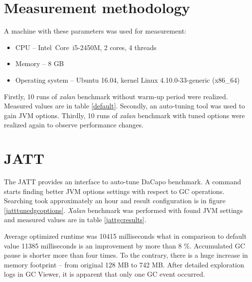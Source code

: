 \documentclass[
  digital, %
  oneside,
  notable, %
  nolof,     %
  nolot     %
]{fithesis3}
\begin{document}
\section{Measurement methodology}
A machine with these parameters was used for measurement:
\begin{itemize}
	\item CPU -- Intel\textregistered\ Core\texttrademark\ i5-2450M, 2 cores, 4 threads
	\item Memory -- 8 GB
	\item Operating system -- Ubuntu 16.04, kernel Linux 4.10.0-33-generic (x86\_64)
\end{itemize}

Firstly, 10 runs of \textit{xalan} benchmark without warm-up period were realized. Measured values are in table \ref{default}. Secondly, an auto-tuning tool was used to gain JVM options. Thirdly, 10 runs of \textit{xalan} benchmark with tuned options were realized again to observe performance changes.


\section{JATT}
The JATT provides an interface to auto-tune DaCapo benchmark. A command \texttt{} starts finding better JVM options settings with respect to GC operations. Searching took approximately an hour and result configuration is in figure \ref{jatttunedgcoptions}. \textit{Xalan} benchmark was performed with found JVM settings and measured values are in table \ref{jattgcresults}.

Average optimized runtime was 10415 milliseconds what in comparison to default value 11385 milliseconds is an improvement by more than 8 \%. Accumulated GC pause is shorter more than four times. To the contrary, there is a huge increase in memory footprint -- from original 128 MB to 742 MB. After detailed exploration logs in GC Viewer, it is apparent that only one GC event occurred.
\end{document}
